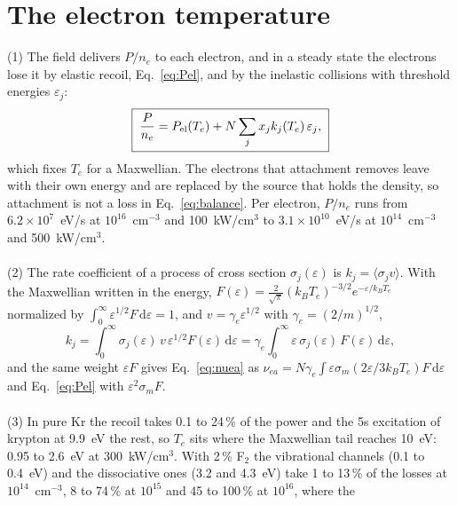 \documentclass[11pt]{article}
\numberwithin{equation}{section}
\newcommand{\nuea}{\nu_{ea}}
\newcommand{\dd}{\mathrm d}
\newcommand{\kB}{k_B}
\newcommand{\Te}{T_e}
\begin{document}
\section{The electron temperature}
\label{sec:temperature}
{\noindent}(1) The field delivers $P/n_e$ to each electron, and in a steady state the
electrons lose it by elastic recoil, Eq.~\eqref{eq:Pel}, and by the inelastic
collisions with threshold energies $\varepsilon_j$:
\begin{equation}
\boxed{\;\frac{P}{n_e}=P_{\rm el}(\Te)+N\sum_jx_jk_j(\Te)\,\varepsilon_j,\;}
\label{eq:balance}
\end{equation}
which fixes $\Te$ for a Maxwellian. The electrons that attachment removes leave with
their own energy and are replaced by the source that holds the density, so attachment
is not a loss in Eq.~\eqref{eq:balance}. Per electron, $P/n_e$ runs from
$6.2\times10^{7}$~eV/s at $10^{16}$~cm$^{-3}$ and 100~kW/cm$^3$ to $3.1\times10^{10}$~eV/s
at $10^{14}$~cm$^{-3}$ and 500~kW/cm$^3$.
\\ \\
{\noindent}(2) The rate coefficient of a process of cross section $\sigma_j(\varepsilon)$
is $k_j=\langle\sigma_jv\rangle$. With the Maxwellian written in the energy,
$F(\varepsilon)=\frac{2}{\sqrt\pi}(\kB\Te)^{-3/2}e^{-\varepsilon/\kB\Te}$ normalized by
$\int_0^\infty\varepsilon^{1/2}F\,\dd\varepsilon=1$, and $v=\gamma_e\varepsilon^{1/2}$ with
$\gamma_e=(2/m)^{1/2}$,
\begin{equation}
\boxed{\;k_j=\int_0^\infty\sigma_j(\varepsilon)\,v\,\varepsilon^{1/2}F(\varepsilon)\,\dd\varepsilon
=\gamma_e\int_0^\infty\varepsilon\,\sigma_j(\varepsilon)\,F(\varepsilon)\,\dd\varepsilon,\;}
\label{eq:rate}
\end{equation}
and the same weight $\varepsilon F$ gives Eq.~\eqref{eq:nuea} as
$\nuea=N\gamma_e\int\varepsilon\sigma_m(2\varepsilon/3\kB\Te)F\,\dd\varepsilon$ and
Eq.~\eqref{eq:Pel} with $\varepsilon^2\sigma_mF$.
\\ \\
{\noindent}(3) In pure Kr the recoil takes 0.1 to 24\,\% of the power and the 5s
excitation of krypton at 9.9~eV the rest, so $\Te$ sits where the Maxwellian tail reaches
10~eV: 0.95 to 2.6~eV at 300~kW/cm$^3$. With 2\,\% F$_2$ the vibrational channels (0.1 to
0.4~eV) and the dissociative ones (3.2 and 4.3~eV) take 1 to 13\,\% of the losses at
$10^{14}$~cm$^{-3}$, 8 to 74\,\% at $10^{15}$ and 45 to 100\,\% at $10^{16}$, where the
\end{document}
